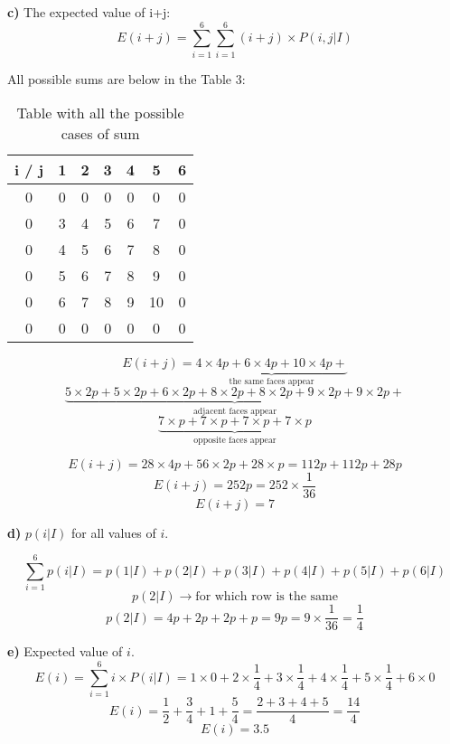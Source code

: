 \documentclass[a4paper, 12pt]{article}
\begin{document}
\begin{flushleft}
\textbf{c)} The expected value of i+j:
$$ E(i+j) = \displaystyle\sum_{i=1}^{6}\displaystyle\sum_{i=1}^{6} (i+j) \times P(i,j|I) $$

All possible sums are below in the Table 3:
\begin{table}[ht]
    \centering
    \begin{tabular}{| c | c | c | c | c | c | c | }
        \hline
        i / j    & 1 & 2  & 3  & 4  & 5  & 6 \\
        \hline
        0   & 0 & 0 & 0  & 0  & 0  & 0 \\
        \hline
        0   & 3 & 4 & 5 & 6 & 7  & 0 \\
        \hline
        0   & 4 & 5 & 6 & 7  & 8 & 0 \\
        \hline
        0   & 5 & 6 & 7  & 8 & 9 & 0 \\
        \hline
        0   & 6 & 7  & 8 & 9 & 10 & 0 \\
        \hline
        0   & 0 & 0  & 0  & 0  & 0 &0 \\
        \hline
    \end{tabular}
    \caption{Table with all the possible cases of sum}
    \label{tab:allprob}
\end{table}
$$ E(i+j) = \underbrace{4 \times 4p + 6 \times 4p + 10 \times 4p +}_{\textrm{the same faces appear}} $$
$$ \underbrace{5 \times 2p + 5 \times 2p + 6 \times 2p + 8 \times 2p + 8 \times 2p + 9 \times 2p + 9 \times 2p +}_{\textrm{adjacent faces appear}} $$
$$ \underbrace{7 \times p + 7 \times p + 7 \times p + 7 \times p}_{\textrm{opposite faces appear}} $$

$$ E(i+j) = 28 \times 4p + 56 \times 2p + 28 \times p = 112p + 112p + 28p $$
$$ E(i+j) = 252p = 252 \times \frac{1}{36} $$
$$ E(i+j) = 7 $$

\textbf{d)} $p(i|I)$ for all values of $i$.

$$ \displaystyle\sum_{i=1}^{6}p(i|I) = p(1|I) + p(2|I) + p(3|I) + p(4|I) + p(5|I) + p(6|I) $$
$$ p(2|I) \rightarrow \textrm{for which row is the same} $$
$$ p(2|I) = 4p + 2p + 2p + p = 9p = 9 \times \frac{1}{36} = \frac{1}{4}$$

\textbf{e)} Expected value of $i$.
$$ E(i) = \displaystyle\sum_{i=1}^{6}i \times P(i|I) = 1 \times 0 + 2 \times \frac{1}{4} + 3 \times \frac{1}{4} + 4 \times \frac{1}{4} + 5 \times \frac{1}{4} + 6 \times 0   $$
$$ E(i) = \frac{1}{2} + \frac{3}{4} + 1 + \frac{5}{4} = \frac{2+3+4+5}{4} = \frac{14}{4} $$ 
$$ E(i) = 3.5 $$



\end{flushleft}
\end{document}
